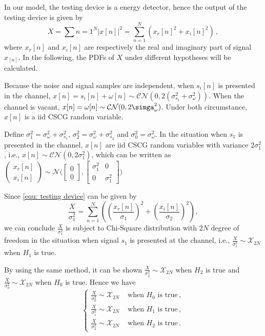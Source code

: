 \documentclass[12pt,journal,a4paper,twoside,onecolumn,draft]{IEEEtran}
\begin{document}
\begin{spacing}{2.5}
In our model, the testing device is a energy detector, hence the output of the testing device is given by
\begin{equation}
\label{equ: testing device}
X = \sum{n=1}^{N}|x[n]|^2 = \sum_{n=1}^{N}(x_r[n]^2+x_i[n]^2)\,,
\end{equation}
where $x_r[n]$ and $x_i[n]$ are respectively the real and imaginary part of signal $x_[n]$. In the following, the PDFs of $X$ under different hypotheses will be calculated. 

Because the noise and signal samples are independent, when $s_i[n]$ is presented in the channel, $x[n] = s_i[n]+\omega[n] \sim \mathcal{CN}(0, 2(\sigma_{s_i}^2 + \sigma_\omega^2))$. 
When the channel is vacant, $x[n] = \omega[n] \sim \mathcal{CN}(0, 2\simga_\omega^2)$. 
Under both circumstance, $x[n]$ is a iid CSCG random variable. 

Define $\sigma_1^2 = \sigma_\omega^2 + \sigma_{s_1}^2$, $\sigma_2^2 = \sigma_\omega^2 + \sigma_{s_2}^2$ and $\sigma_0^2 = \sigma_\omega^2$. 
In the situation when $s_1$ is presented in the channel, $x[n]$ are iid CSCG random variables with variance $2\sigma_1^2$, i.e., $x[n] \sim \mathcal{CN}(0, 2\sigma_1^2)$, which can be written as $\begin{pmatrix} x_r[n] \\ x_i[n] \end{pmatrix} \sim \mathcal{N}\Big( \begin{bmatrix} 0 \\ 0 \end{bmatrix}, \begin{bmatrix} \sigma_1^2 & 0\\ 0 & \sigma_1^2 \end{bmatrix} \Big)$

Since \eqref{equ: testing device} can be given by
 \begin{equation}
 \frac{X}{\sigma_1^2} = \sum_{n=1}^{N}((\frac{x_r[n]}{\sigma_1})^2 + (\frac{x_i[n]}{\sigma_2})^2 ),
\end{equation}
we can conclude $\frac{X}{\sigma_1^2}$ is subject to Chi-Square distribution with $2N$ degree of freedom in the situation when signal $s_1$ is presented at the channel, i.e., $\frac{X}{\sigma_1^2} \sim \mathcal{X}_{2N}$ when $H_1$ is true. 

By using the same method, it can be shown $\frac{X}{\sigma_2^2} \sim \mathcal{X}_{2N}$ when $H_2$ is true and $\frac{X}{\sigma_0^2} \sim \mathcal{X}_{2N}$ when $H_0$ is true. Hence we have
\begin{equation}
\label{equ: abstract}
\begin{cases}
\frac{X}{\sigma_0^2} \sim \mathcal{X}_{2N}\;\;\;\;\text{when $H_0$ is true}\,,\\
\frac{X}{\sigma_1^2} \sim \mathcal{X}_{2N}\;\;\;\;\text{when $H_1$ is true}\,,\\
\frac{X}{\sigma_2^2} \sim \mathcal{X}_{2N}\;\;\;\;\text{when $H_2$ is true}\,.
\end{cases}
\end{equation}


\end{spacing}
\end{document}

